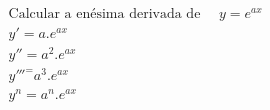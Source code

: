 \begin{ex}
\begin{align}
&\text{Calcular a enésima derivada de }\quad y=e^{ax}\nonumber\\
&y'=a.e^{ax}\nonumber\\
&y''=a^2.e^{ax}\nonumber\\
&y'''^=a^3.e^{ax}\nonumber\\
&y^{n}=a^{n}.e^{ax}\nonumber
\end{align}
\end{ex}